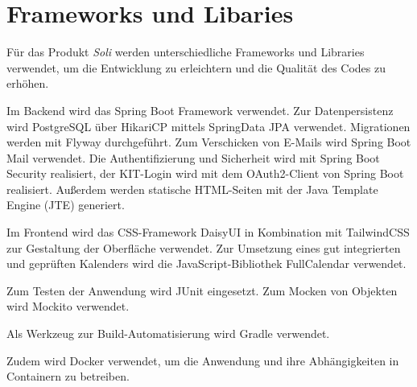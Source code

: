 \chapter{Frameworks und Libaries}
\label{ch:frameworks_libaries}

Für das Produkt \textit{Soli} werden unterschiedliche Frameworks und Libraries verwendet, um die Entwicklung zu erleichtern und die Qualität des Codes zu erhöhen.

Im Backend wird das \gls{Spring Boot} Framework verwendet.
Zur Datenpersistenz wird \gls{PostgreSQL} über HikariCP mittels \gls{SpringData} JPA verwendet.
Migrationen werden mit \gls{Flyway} durchgeführt.
Zum Verschicken von E-Mails wird Spring Boot Mail verwendet.
Die Authentifizierung und Sicherheit wird mit Spring Boot Security realisiert, der KIT-Login wird mit dem OAuth2-Client von Spring Boot realisiert.
Außerdem werden statische \gls{HTML}-Seiten mit der Java Template Engine (JTE) generiert.

Im Frontend wird das \gls{CSS}-Framework \gls{DaisyUI} in Kombination mit TailwindCSS zur Gestaltung der Oberfläche verwendet.
Zur Umsetzung eines gut integrierten und geprüften Kalenders wird die \gls{JavaScript}-Bibliothek \gls{FullCalendar} verwendet.

Zum Testen der Anwendung wird \gls{JUnit} eingesetzt.
Zum Mocken von Objekten wird \gls{Mockito} verwendet.

Als Werkzeug zur Build-Automatisierung wird \gls{Gradle} verwendet.

Zudem wird \gls{Docker} verwendet, um die Anwendung und ihre Abhängigkeiten in \gls{Container}n zu betreiben.